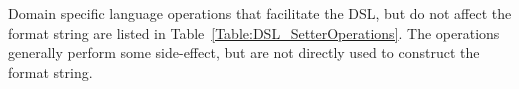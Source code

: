 








Domain specific language operations that facilitate the DSL, but do not affect the format string are listed in Table~\ref{Table:DSL_SetterOperations}. The operations generally perform some side-effect, but are not directly used to construct the format string.

